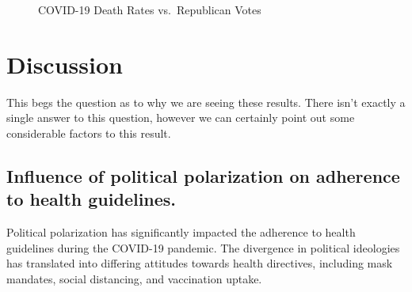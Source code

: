 \documentclass[
  letterpaper,
  DIV=11,
  numbers=noendperiod]{scrartcl}
\begin{document}
\begin{figure}


\caption{\label{fig-deaths\_rates\_votes}COVID-19 Death Rates
vs.~Republican Votes}

\end{figure}%

\newpage

\section{Discussion}\label{discussion}

This begs the question as to why we are seeing these results. There
isn't exactly a single answer to this question, however we can certainly
point out some considerable factors to this result.

\subsection{Influence of political polarization on adherence to health
guidelines.}\label{influence-of-political-polarization-on-adherence-to-health-guidelines.}

Political polarization has significantly impacted the adherence to
health guidelines during the COVID-19 pandemic. The divergence in
political ideologies has translated into differing attitudes towards
health directives, including mask mandates, social distancing, and
vaccination uptake.
\end{document}
